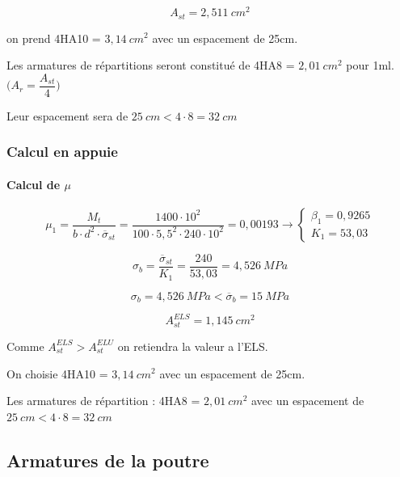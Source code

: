 \documentclass[12pt,a4paper]{article}
\begin{document}
	
	\[ A_{st} = 2,511 ~\unit{cm^{2}} \]
	
	on prend 4HA10 = $3,14 ~\unit{cm^{2}}$ avec un espacement de 25cm.
	
	
	Les armatures de répartitions seront constitué de 4HA8 = $2,01 ~\unit{cm^{2}}$ pour 1ml. $\bigg(A_{r} = \dfrac{A_{st}}{4}\bigg) $
	
	
	Leur espacement sera de $25 ~\unit{cm} < 4 \cdot 8 = 32 ~\unit{cm}$
	
	
	\subsubsection{Calcul en appuie}
	
	\paragraph{Calcul de $\mu$}
	
	\[ \mu_{1} = \dfrac{M_{t}}{b \cdot d^{2} \cdot \overline{\sigma}_{st}} 
	=
	\dfrac{1400 \cdot 10^{2}}{100 \cdot 5,5^{2} \cdot 240 \cdot 10^{2}}
	= 0,00193 \rightarrow
	\begin{cases}
		\beta_{1} = 0,9265 \\
		K_{1} = 53,03
	\end{cases}
	\]
	
	
	\[ \sigma_{b} = \dfrac{\overline{\sigma}_{st}}{K_{1}} = \dfrac{240}{53,03} = 4,526 ~\unit{MPa} \]
	
	
	
	\[ \sigma_{b} = 4,526 ~\unit{MPa} < \overline{\sigma}_{b} = 15 ~\unit{MPa} \]
	
	\vspace{\baselineskip}
	
	\[ A_{st}^{ELS} = 1,145 ~\unit{cm^{2}} \]
	
	Comme $A_{st}^{ELS} > A_{st}^{ELU}$ on retiendra la valeur a l'ELS.
	
	\vspace{\baselineskip}
	
	On choisie 4HA10 = $3,14 ~\unit{cm^{2}}$ avec un espacement de 25cm.
	
	\vspace{\baselineskip}
	
	Les armatures de répartition : 4HA8 = $2,01 ~\unit{cm^{2}}$ avec un espacement de $25 ~\unit{cm} < 4 \cdot 8 = 32 ~\unit{cm}$
	
	
	
	\subsection{Armatures de la poutre}
	
\end{document}
